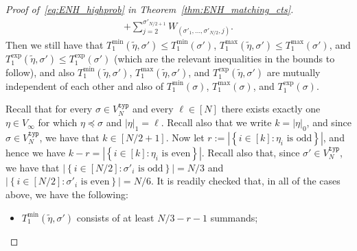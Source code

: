 \documentclass[11pt]{article}
\numberwithin{equation}{section}
\newcommand{\wt}{\widetilde} %
\theoremstyle{definition}
\begin{document}
\begin{proof}[Proof of~\eqref{eq:ENH_highprob} in Theorem~\ref{thm:ENH_matching_cts}]
\begin{align*}
    +
    \sum_{j=2}^{\sigma'_{N/2+1}} W_{(\sigma'_1,\ldots,\sigma'_{N/2},j)}.
\end{align*}
Then we still have that 
$T_{1}^{\min}(\wt{\eta}, \sigma') \leq T_{1}^{\min}(\sigma')$, 
$T_{1}^{\max}(\wt{\eta}, \sigma') \leq T_{1}^{\max}(\sigma')$, 
and 
$T_{1}^{\exp}(\wt{\eta}, \sigma') \leq T_{1}^{\exp}(\sigma')$ 
(which are the relevant inequalities in the bounds to follow), 
and also 
$T_{1}^{\min} \left( \wt{\eta}, \sigma' \right)$, 
$T_{1}^{\max} \left( \wt{\eta}, \sigma' \right)$, 
and 
$T_{1}^{\exp} \left( \wt{\eta}, \sigma' \right)$ 
are mutually independent of each other 
and also of 
$T_{1}^{\min} \left( \sigma \right)$, 
$T_{1}^{\max} \left( \sigma \right)$, 
and 
$T_{1}^{\exp} \left( \sigma \right)$. 


Recall that for every $\sigma \in V_N^{\mathtt{typ}}$ and every $\ell \in [N]$ there exists exactly one $\eta \in V_{\infty}$ for which $\eta \preccurlyeq \sigma$ and $\left| \eta \right|_{1} = \ell$. 
Recall also that we write $k = \left| \eta \right|_{0}$, and since $\sigma \in V_{N}^{\mathtt{typ}}$, we have that $k \in [N/2 + 1]$. 
Now let 
$r := \left| \left\{ i \in [k] : \eta_{i} \text{ is odd} \right\} \right|$, 
and hence we have 
$k-r = \left| \left\{ i \in [k] : \eta_{i} \text{ is even} \right\} \right|$. 
Recall also that, since $\sigma' \in V_{N}^{\mathtt{typ}}$, we have that 
$\left| \left\{ i \in [N/2] : \sigma'_{i} \text{ is odd} \right\} \right| = N/3$ 
and 
$\left| \left\{ i \in [N/2] : \sigma'_{i} \text{ is even} \right\} \right| = N/6$.
It is readily checked that, in all of the cases above, we have the following: 
\begin{itemize}
\item $T_{1}^{\min}(\wt{\eta}, \sigma')$ consists of at least $N/3 - r - 1$ summands; 




\end{itemize}
\end{proof}
\end{document}
